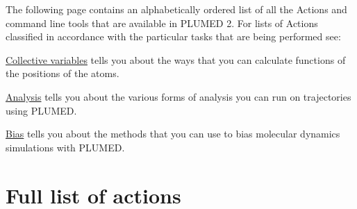 The following page contains an alphabetically ordered list of all the Actions and command line tools that are available in P\+L\+U\+M\+E\+D 2. For lists of Actions classified in accordance with the particular tasks that are being performed see\+:


\begin{DoxyItemize}
\item \hyperlink{colvarintro}{Collective variables} tells you about the ways that you can calculate functions of the positions of the atoms.
\item \hyperlink{_analysis}{Analysis} tells you about the various forms of analysis you can run on trajectories using P\+L\+U\+M\+E\+D.
\item \hyperlink{_bias}{Bias} tells you about the methods that you can use to bias molecular dynamics simulations with P\+L\+U\+M\+E\+D.
\end{DoxyItemize}\hypertarget{glossary_ActionList}{}\section{Full list of actions}\label{glossary_ActionList}
